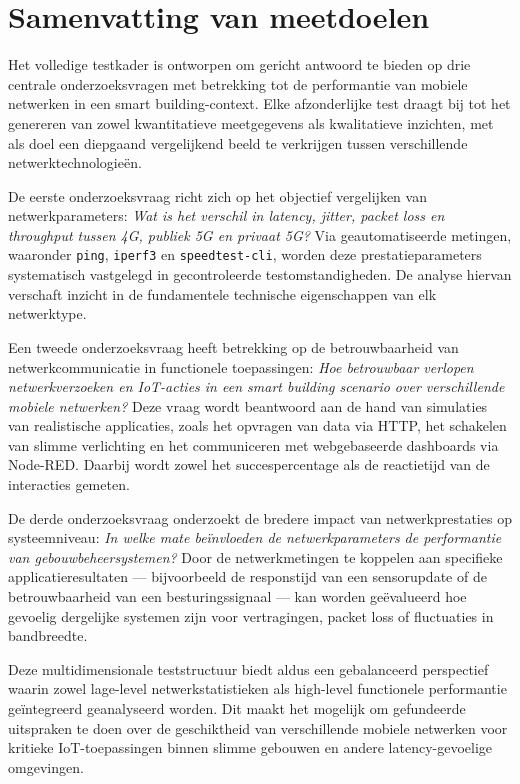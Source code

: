 \section{Samenvatting van meetdoelen}


Het volledige testkader is ontworpen om gericht antwoord te bieden op drie centrale onderzoeksvragen met betrekking tot de performantie van mobiele netwerken in een smart building-context. Elke afzonderlijke test draagt bij tot het genereren van zowel kwantitatieve meetgegevens als kwalitatieve inzichten, met als doel een diepgaand vergelijkend beeld te verkrijgen tussen verschillende netwerktechnologieën.

De eerste onderzoeksvraag richt zich op het objectief vergelijken van netwerkparameters: \textit{Wat is het verschil in latency, jitter, packet loss en throughput tussen 4G, publiek 5G en privaat 5G?} Via geautomatiseerde metingen, waaronder \texttt{ping}, \texttt{iperf3} en \texttt{speedtest-cli}, worden deze prestatieparameters systematisch vastgelegd in gecontroleerde testomstandigheden. De analyse hiervan verschaft inzicht in de fundamentele technische eigenschappen van elk netwerktype.

Een tweede onderzoeksvraag heeft betrekking op de betrouwbaarheid van netwerkcommunicatie in functionele toepassingen: \textit{Hoe betrouwbaar verlopen netwerkverzoeken en IoT-acties in een smart building scenario over verschillende mobiele netwerken?} Deze vraag wordt beantwoord aan de hand van simulaties van realistische applicaties, zoals het opvragen van data via HTTP, het schakelen van slimme verlichting en het communiceren met webgebaseerde dashboards via Node-RED. Daarbij wordt zowel het succespercentage als de reactietijd van de interacties gemeten.

De derde onderzoeksvraag onderzoekt de bredere impact van netwerkprestaties op systeemniveau: \textit{In welke mate beïnvloeden de netwerkparameters de performantie van gebouwbeheersystemen?} Door de netwerkmetingen te koppelen aan specifieke applicatieresultaten — bijvoorbeeld de responstijd van een sensorupdate of de betrouwbaarheid van een besturingssignaal — kan worden geëvalueerd hoe gevoelig dergelijke systemen zijn voor vertragingen, packet loss of fluctuaties in bandbreedte.

Deze multidimensionale teststructuur biedt aldus een gebalanceerd perspectief waarin zowel lage-level netwerkstatistieken als high-level functionele performantie geïntegreerd geanalyseerd worden. Dit maakt het mogelijk om gefundeerde uitspraken te doen over de geschiktheid van verschillende mobiele netwerken voor kritieke IoT-toepassingen binnen slimme gebouwen en andere latency-gevoelige omgevingen.

